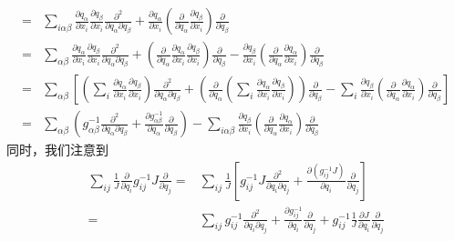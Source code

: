 \begin{note}
\begin{equation}
\begin{aligned}
    =& \sum_{i \alpha\beta} \frac{\partial q_{\alpha}}{\partial x_{i}} \frac{\partial q_{\beta}}{\partial x_{i}} \frac{\partial^2}{\partial q_{\alpha}\partial q_{\beta}} + \frac{\partial q_{\alpha}}{\partial x_{i}}  \left(\frac{\partial}{\partial q_{\alpha}}\frac{\partial q_{\beta}}{\partial x_{i}}\right) \frac{\partial}{\partial q_{\beta}}\\
    =& \sum_{\alpha\beta} \frac{\partial q_{\alpha}}{\partial x_{i}} \frac{\partial q_{\beta}}{\partial x_{i}} \frac{\partial^2}{\partial q_{\alpha}\partial q_{\beta}} + \left(\frac{\partial}{\partial q_{\alpha}}\frac{\partial q_{\alpha}}{\partial x_{i}}\frac{\partial q_{\beta}}{\partial x_{i}}\right) \frac{\partial}{\partial q_{\beta}} - \frac{\partial q_{\beta}}{\partial x_{i}} \left(\frac{\partial}{\partial q_{\alpha}}\frac{\partial q_{\alpha}}{\partial x_{i}}\right) \frac{\partial}{\partial q_{\beta}} \\
    =& \sum_{\alpha\beta} \left[\left(\sum_{i}\frac{\partial q_{\alpha}}{\partial x_{i}} \frac{\partial q_{\beta}}{\partial x_{i}}\right) \frac{\partial^2}{\partial q_{\alpha}\partial q_{\beta}} + \left(\frac{\partial}{\partial q_{\alpha}} \left(\sum_{i}\frac{\partial q_{\alpha}}{\partial x_{i}}\frac{\partial q_{\beta}}{\partial x_{i}}\right)\right) \frac{\partial}{\partial q_{\beta}} - \sum_{i}\frac{\partial q_{\beta}}{\partial x_{i}} \left(\frac{\partial}{\partial q_{\alpha}}\frac{\partial q_{\alpha}}{\partial x_{i}}\right) \frac{\partial}{\partial q_{\beta}}\right] \\
    =& \sum_{\alpha\beta} \left(g^{-1}_{\alpha\beta} \frac{\partial^2}{\partial q_{\alpha}\partial q_{\beta}} + \frac{\partial g^{-1}_{\alpha\beta}}{\partial q_{\alpha}} \frac{\partial}{\partial q_{\beta}}\right) - \sum_{i\alpha\beta}\frac{\partial q_{\beta}}{\partial x_{i}} \left( \frac{\partial}{\partial q_{\alpha}}\frac{\partial q_{\alpha}}{\partial x_{i}}\right) \frac{\partial}{\partial q_{\beta}}
\end{aligned}\end{equation}
同时，我们注意到
\begin{equation}\begin{aligned}
    \sum_{ij}\frac{1}{J} \frac{\partial}{\partial q_{i}}{g}^{-1}_{ij} J \frac{\partial}{\partial q_j} =& \sum_{ij}\frac{1}{J} \left[{g}^{-1}_{ij} J \frac{\partial^2}{\partial q_{i}\partial q_{j}} + \frac{\partial ({g}^{-1}_{ij}J)}{\partial q_{i}} \frac{\partial}{\partial q_{j}}\right] \\
    =& \sum_{ij}{g}^{-1}_{ij} \frac{\partial^2}{\partial q_{i}\partial q_{j}} + \frac{\partial {g}^{-1}_{ij}}{\partial q_{i}} \frac{\partial}{\partial q_{j}} + {g}^{-1}_{ij}\frac{1}{J}\frac{\partial J}{\partial q_{i}} \frac{\partial}{\partial q_{j}} \\

\end{aligned}
\end{equation}
\end{note}
